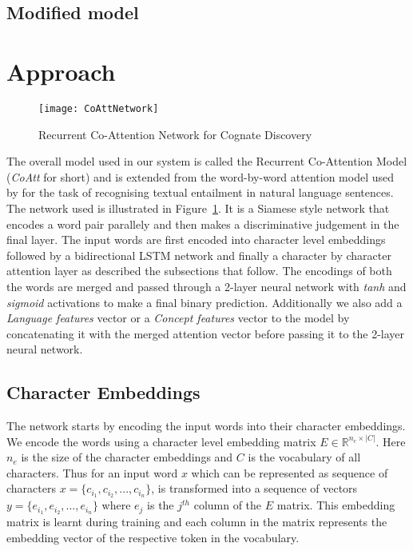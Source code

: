 \documentclass[11pt,letterpaper]{article}
\begin{document}
\subsection{Modified model}

\section{Approach}

\begin{figure}[t]
	\centering
	\texttt{[image: CoAttNetwork]}
    \caption{Recurrent Co-Attention Network for Cognate Discovery}
    \label{CoAttNet}
\end{figure}

The overall model used in our system is called the Recurrent Co-Attention Model (\textit{CoAtt} for short) and is extended from the word-by-word attention model used by \citet{rocktaschel2016reasoning} for the task of recognising textual entailment in natural language sentences. The network used is illustrated in Figure~\ref{CoAttNet}. It is a Siamese style network that encodes a word pair parallely and then makes a discriminative judgement in the final layer. The input words are first encoded into character level embeddings followed by a bidirectional LSTM network and finally a character by character attention layer as described the subsections that follow. The encodings of both the words are merged and passed through a 2-layer neural network with \textit{tanh} and \textit{sigmoid} activations to make a final binary prediction. Additionally we also add a \textit{Language features} vector or a \textit{Concept features} vector to the model by concatenating it with the merged attention vector before passing it to the 2-layer neural network.

\subsection{Character Embeddings}

The network starts by encoding the input words into their character embeddings. We encode the words using a character level embedding matrix $E \in \mathbb{R}^{n_e \times |C|}$. Here $n_e$ is the size of the character embeddings and $C$ is the vocabulary of all characters. Thus for an input word $x$ which can be represented as sequence of characters $x = \{c_{i_1}, c_{i_2}, ..., c_{i_n}\}$, is transformed into a sequence of vectors $y = \{e_{i_1}, e_{i_2}, ..., e_{i_n}\}$ where $e_j$ is the $j^{th}$ column of the $E$ matrix. This embedding matrix is learnt during training and each column in the matrix represents the embedding vector of the respective token in the vocabulary. 
\end{document}
